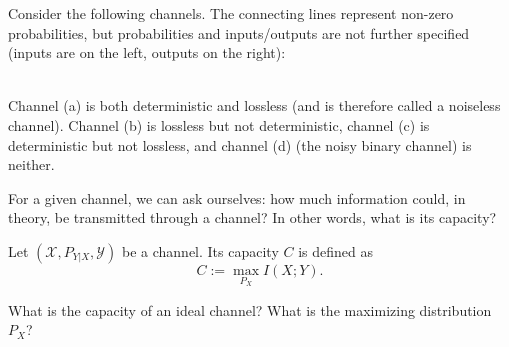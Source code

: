 \begin{example}
Consider the following channels. The connecting lines represent non-zero probabilities, but probabilities and inputs/outputs are not further specified (inputs are on the left, outputs on the right):\\
\\Channel (a) is both deterministic and lossless (and is therefore called a noiseless channel). Channel (b) is lossless but not deterministic, channel (c) is deterministic but not lossless, and channel (d) (the noisy binary channel) is neither.
\end{example}

For a given channel, we can ask ourselves: how much information could, in theory, be transmitted through a channel? In other words, what is its capacity?

\begin{definition}
Let $(\mathcal{X}, P_{Y|X}, \mathcal{Y})$ be a channel. Its capacity $C$ is defined as
\[
C := \max_{P_X} I(X;Y).
\]
\end{definition}

\begin{exercise}
What is the capacity of an ideal channel? What is the maximizing distribution $P_X$?
\end{exercise}


